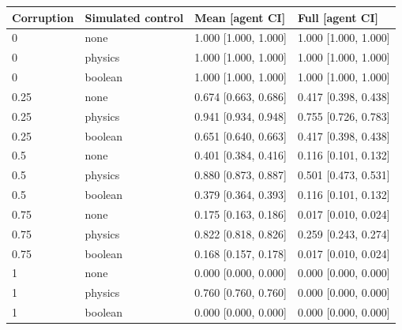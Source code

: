\begin{tabular}{llll}\toprule
Corruption & Simulated control & Mean [agent CI] & Full [agent CI]\\ \midrule
0 & none & 1.000 [1.000, 1.000] & 1.000 [1.000, 1.000]\\
0 & physics & 1.000 [1.000, 1.000] & 1.000 [1.000, 1.000]\\
0 & boolean & 1.000 [1.000, 1.000] & 1.000 [1.000, 1.000]\\
0.25 & none & 0.674 [0.663, 0.686] & 0.417 [0.398, 0.438]\\
0.25 & physics & 0.941 [0.934, 0.948] & 0.755 [0.726, 0.783]\\
0.25 & boolean & 0.651 [0.640, 0.663] & 0.417 [0.398, 0.438]\\
0.5 & none & 0.401 [0.384, 0.416] & 0.116 [0.101, 0.132]\\
0.5 & physics & 0.880 [0.873, 0.887] & 0.501 [0.473, 0.531]\\
0.5 & boolean & 0.379 [0.364, 0.393] & 0.116 [0.101, 0.132]\\
0.75 & none & 0.175 [0.163, 0.186] & 0.017 [0.010, 0.024]\\
0.75 & physics & 0.822 [0.818, 0.826] & 0.259 [0.243, 0.274]\\
0.75 & boolean & 0.168 [0.157, 0.178] & 0.017 [0.010, 0.024]\\
1 & none & 0.000 [0.000, 0.000] & 0.000 [0.000, 0.000]\\
1 & physics & 0.760 [0.760, 0.760] & 0.000 [0.000, 0.000]\\
1 & boolean & 0.000 [0.000, 0.000] & 0.000 [0.000, 0.000]\\
\bottomrule\end{tabular}
